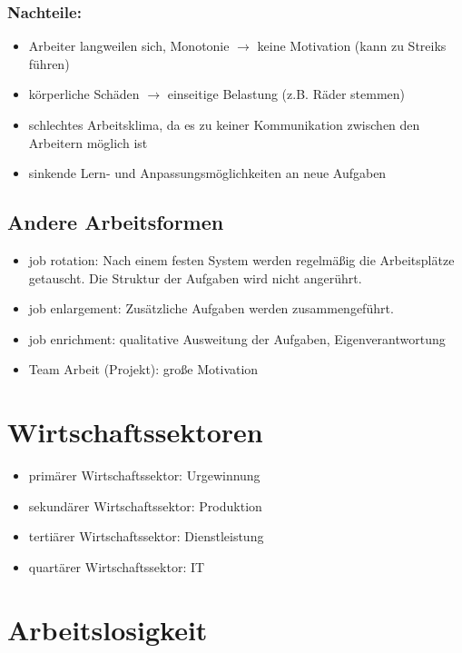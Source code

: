 \documentclass[a4paper]{report}
\begin{document}
\subsection{Nachteile:}

\begin{itemize}
\item Arbeiter langweilen sich, Monotonie $\rightarrow$ keine Motivation (kann zu Streiks führen)
\item körperliche Schäden $\rightarrow$ einseitige Belastung (z.B. Räder stemmen)
\item schlechtes Arbeitsklima, da es zu keiner Kommunikation zwischen den Arbeitern möglich ist
\item sinkende Lern- und Anpassungsmöglichkeiten an neue Aufgaben
\end{itemize}

\section{Andere Arbeitsformen}

\begin{itemize}
\item job rotation: Nach einem festen System werden regelmäßig die Arbeitsplätze getauscht. Die Struktur der Aufgaben wird nicht angerührt.
\item job enlargement: Zusätzliche Aufgaben werden zusammengeführt.
\item job enrichment: qualitative Ausweitung der Aufgaben, Eigenverantwortung
\item Team Arbeit (Projekt): große Motivation
\end{itemize}

\chapter{Wirtschaftssektoren}

\begin{itemize}
\item primärer Wirtschaftssektor: Urgewinnung
\item sekundärer Wirtschaftssektor: Produktion
\item tertiärer Wirtschaftssektor: Dienstleistung
\item quartärer Wirtschaftssektor: IT
\end{itemize}

\chapter{Arbeitslosigkeit}
\end{document}
